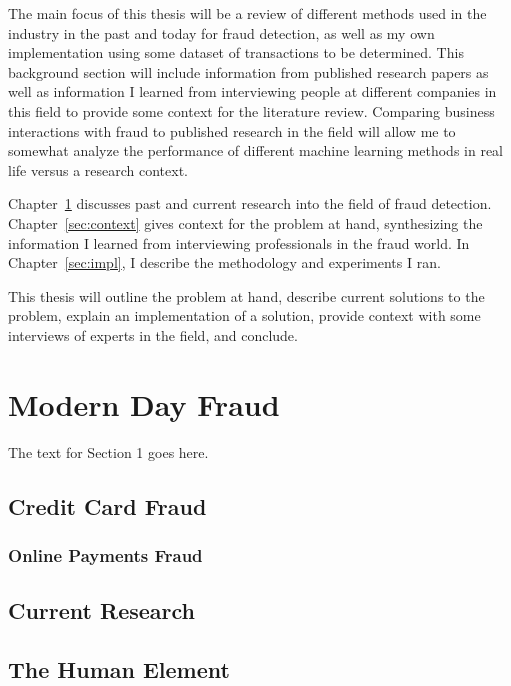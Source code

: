 \documentclass[midd]{thesis}
\begin{document}
The main focus of this thesis will be a review of different methods used in the industry in the past and today for fraud detection, as well as my own implementation using some dataset of transactions to be determined. This background section will include information from published research papers as well as information I learned from interviewing people at different companies in this field to provide some context for the literature review. Comparing business interactions with fraud to published research in the field will allow me to somewhat analyze the performance of different machine learning methods in real life versus a research context.  

Chapter~\ref{sec:background} discusses past and current research into the field of fraud detection. Chapter~\ref{sec:context} gives context for the problem at hand, synthesizing the information I learned from interviewing professionals in the fraud world. In Chapter~\ref{sec:impl}, I describe the methodology and experiments I ran.

This thesis will outline the problem at hand, describe current solutions to the problem, explain an implementation of a solution, provide context with some interviews of experts in the field, and conclude.



\pagebreak

\chapter{Modern Day Fraud}
\label{sec:background}
The text for Section 1 goes here.


\section{Credit Card Fraud}



\subsection{Online Payments Fraud}


\section{Current Research}


\section{The Human Element}
\end{document}
